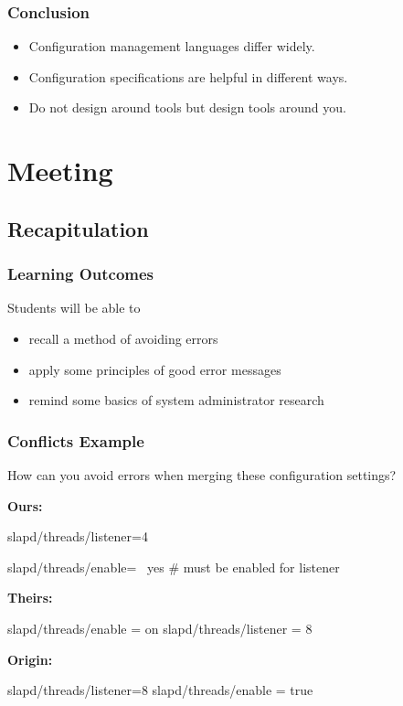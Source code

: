 \begin{frame}
	\frametitle{Conclusion}

	\begin{itemize}[<+-| alert@+>]
	\item Configuration management languages differ widely.
	\item Configuration specifications are helpful in different ways.
	\item Do not design around tools but design tools around you.
	\end{itemize}
\end{frame}

\section{Meeting}

\subsection{Recapitulation}

\begin{frame}
	\frametitle{Learning Outcomes}
	Students will be able to
	\begin{itemize}
	\item recall a method of avoiding errors
	\item apply some principles of good error messages
	\item remind some basics of system administrator research
	\end{itemize}
\end{frame}

\begin{frame}[fragile]
	\frametitle{Conflicts Example}
	How can you avoid errors when merging these configuration settings?

	\textbf{Ours:}
	\begin{code}[gobble=4,language=CfgElektra]
	slapd/threads/listener=4

	slapd/threads/enable= \
		yes # must be enabled for listener

	\end{code}

	\textbf{Theirs:}
	\begin{code}[gobble=4,language=CfgElektra]
	slapd/threads/enable = on
	slapd/threads/listener = 8
	\end{code}

	\textbf{Origin:}
	\begin{code}[gobble=4,language=CfgElektra]
	slapd/threads/listener=8
	slapd/threads/enable = true
	\end{code}
\end{frame}

